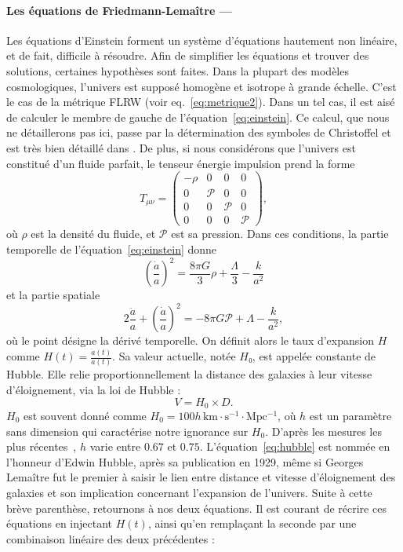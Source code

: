 \documentclass[11pt, twoside, a4paper, openright]{report}
\begin{document}
\paragraph{Les équations de Friedmann-Lemaître —}
Les équations d'Einstein forment un système d'équations hautement non linéaire, et de fait, difficile à résoudre. Afin de simplifier les équations et trouver des solutions, certaines hypothèses sont faites. Dans la plupart des modèles cosmologiques, l'univers est supposé homogène et isotrope à grande échelle. C'est le cas de la métrique FLRW (voir eq.~\ref{eq:metrique2}). Dans un tel cas, il est aisé de calculer le membre de gauche de l'équation~\ref{eq:einstein}. Ce calcul, que nous ne détaillerons pas ici, passe par la détermination des symboles de Christoffel et est très bien détaillé dans \cite{prov: Dodelson 2.1.2}. De plus, si nous considérons que l'univers est constitué d'un fluide parfait, le tenseur énergie impulsion prend la forme
\begin{equation}
  T_{\mu \nu} =
  \begin{pmatrix}
    -\rho & 0 & 0 & 0 \\
    0 & \mathcal{P} & 0 & 0\\
    0 & 0 & \mathcal{P} & 0\\
    0 & 0 & 0 & \mathcal{P}
  \end{pmatrix} ,
\end{equation}
où $\rho$ est la densité du fluide, et $\mathcal{P}$ est sa pression. Dans ces conditions, la partie temporelle de l'équation~\ref{eq:einstein} donne
\begin{equation}
  \label{eq:friedmann1}
  \left(\frac{\dot{a}}{a}\right)^2 = \frac{8 \pi G}{3}\rho + \frac{\Lambda}{3} - \frac{k}{a^2} 
\end{equation}
et la partie spatiale
\begin{equation}
  \label{eq:friedmann2}
  2 \frac{\ddot{a}}{a} + \left(\frac{\dot{a}}{a}\right)^2 = - 8 \pi G \mathcal{P} + \Lambda - \frac{k}{a^2} ,
\end{equation}
où le point désigne la dérivé temporelle. On définit alors le taux d'expansion $H$ comme $H(t) = \frac{\dot{a}(t)}{a(t)}$. Sa valeur actuelle, notée $H₀$, est appelée constante de Hubble. Elle relie proportionnellement la distance des galaxies à leur vitesse d'éloignement, via la loi de Hubble :
\begin{equation}
  \label{eq:hubble}
  V = H_0 \times D.
\end{equation}
$H_0$ est souvent donné comme $H_0 = 100 h\,\mathrm{km \cdot s^{-1} \cdot Mpc^{-1}}$, où $h$ est un paramètre sans dimension qui caractérise notre ignorance sur $H_0$. D'après les mesures les plus récentes~\cite{CITE planck + Riess ?}, $h$ varie entre $\num{0,67}$ et $\num{0,75}$. L'équation~\ref{eq:hubble} est nommée en l'honneur d'Edwin Hubble, après sa publication en 1929, même si Georges Lemaître fut le premier à saisir le lien entre distance et vitesse d'éloignement des galaxies et son implication concernant l'expansion de l'univers. Suite à cette brève parenthèse, retournons à nos deux équations. Il est courant de récrire ces équations en injectant $H(t)$, ainsi qu'en remplaçant la seconde par une combinaison linéaire des deux précédentes :
\end{document}
